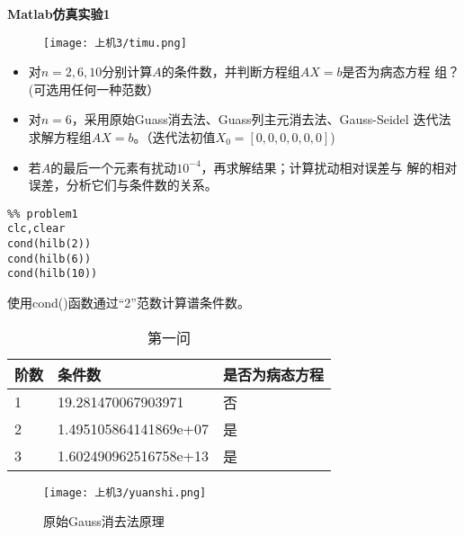 \documentclass[a4paper,12pt]{ctexart}
\begin{document}
\centerline{\Large{\textbf{Matlab仿真实验1}}}
\begin{figure}[H]
    \centering
    \texttt{[image: 上机3/timu.png]}
\end{figure}

\begin{itemize}
    \item 对$n=2,6,10$分别计算$A$的条件数，并判断方程组$AX=b$是否为病态方程
          组？(可选用任何一种范数）
    \item 对$n=6$，采用原始Guass消去法、Guass列主元消去法、Gauss-Seidel
          迭代法求解方程组$AX=b$。（迭代法初值$X_0=[0,0,0,0,0,0]$)
    \item 若$A$的最后一个元素有扰动$10^{-4}$，再求解结果；计算扰动相对误差与
          解的相对误差，分析它们与条件数的关系。
\end{itemize}

\begin{lstlisting}
%% problem1
clc,clear
cond(hilb(2))
cond(hilb(6))
cond(hilb(10))
\end{lstlisting}
使用cond()函数通过“2”范数计算谱条件数。
\begin{table}[H]
    \centering
    \caption{第一问}
    \begin{tabular}{lll}
        \hline
        阶数 & 条件数                & 是否为病态方程 \\ \hline
        1    & 19.281470067903971    & 否             \\
        2    & 1.495105864141869e+07 & 是             \\
        3    & 1.602490962516758e+13 & 是             \\
        \hline
    \end{tabular}
\end{table}

\begin{figure}[H]
    \centering
    \caption{原始Gauss消去法原理}
    \texttt{[image: 上机3/yuanshi.png]}
\end{figure}
\end{document}
